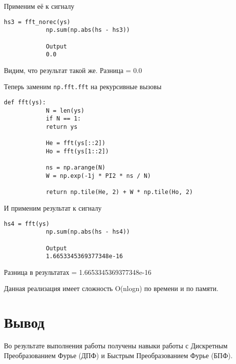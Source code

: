 \documentclass[a4paper,12pt]{article}
\begin{document}
\begin{enumerate}
		Применим её к сигналу
		\begin{lstlisting}[caption=Применение к сигналу]
			hs3 = fft_norec(ys)
			np.sum(np.abs(hs - hs3))
			
			Output
			0.0
		\end{lstlisting}
		
		Видим, что результат такой же. Разница = 0.0
		
		Теперь заменим \texttt{np.fft.fft} на рекурсивные вызовы
		\begin{lstlisting}[caption=Добавление рекурсивных вызовов]
			def fft(ys):
			N = len(ys)
			if N == 1:
			return ys
			
			He = fft(ys[::2])
			Ho = fft(ys[1::2])
			
			ns = np.arange(N)
			W = np.exp(-1j * PI2 * ns / N)
			
			return np.tile(He, 2) + W * np.tile(Ho, 2)
		\end{lstlisting}
		
		И применим результат к сигналу
		\begin{lstlisting}[caption=Применение к сигналу]
			hs4 = fft(ys)
			np.sum(np.abs(hs - hs4))
			
			Output
			1.6653345369377348e-16
		\end{lstlisting}
		
		Разница в результатах = 1.6653345369377348e-16
		
		Данная реализация имеет сложность O(nlogn) по времени и по памяти.
		
		
	\end{enumerate}
	
	
	\section{Вывод}
	
	Во результате выполнения работы получены навыки работы с Дискретным Преобразованием Фурье (ДПФ) и Быстрым Преобразованием Фурье (БПФ).
	
	
\end{document}
